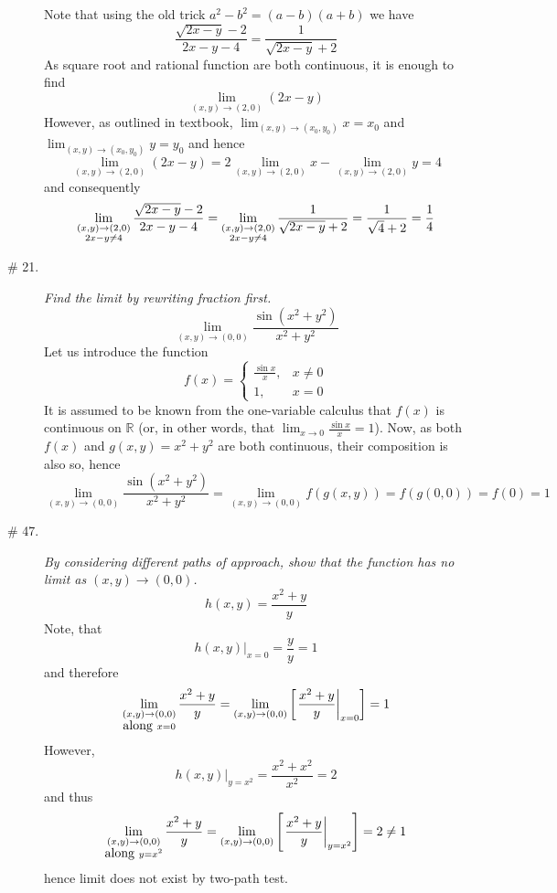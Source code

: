 \documentclass[8pt]{article} %
\begin{document}
\begin{description}
{		Note that using the old trick $a^2-b^2=(a-b)(a+b)$ we have
		\[\frac{\sqrt{2x-y}-2}{2x-y-4}=\frac{1}{\sqrt{2x-y}+2}\]
		As square root and rational function are both continuous, it is enough to find \[\lim_{(x,y)\to(2,0)}(2x-y)\]
		However, as outlined in textbook, $\lim_{(x,y)\to(x_0,y_0)}x=x_0$ and $\lim_{(x,y)\to(x_0,y_0)}y=y_0$ and hence
		\[\lim_{(x,y)\to(2,0)}(2x-y)=2\lim_{(x,y)\to(2,0)}x-\lim_{(x,y)\to(2,0)}y=4\]
		and consequently
		\[\lim_{\begin{subarray}{c}(x,y)\to(2,0)\\2x-y\neq4\end{subarray}}\frac{\sqrt{2x-y}-2}{2x-y-4}
			=\lim_{\begin{subarray}{c}(x,y)\to(2,0)\\2x-y\neq4\end{subarray}}\frac{1}{\sqrt{2x-y}+2}=\frac{
				1}{\sqrt{4}+2}=\frac{1}{4}\]
		}
	\item[\# 21.]{{\it Find the limit by rewriting fraction first.}
		\[\lim_{(x,y)\to(0,0)}\frac{\sin(x^2+y^2)}{x^2+y^2}\]
		Let us introduce the function
		\[f(x)=\left\{\begin{array}{ll}\frac{\sin x}{x},&x\neq 0\\1,&x=0\end{array}\right.\]
		It is assumed to be known from the one-variable calculus that $f(x)$ is continuous on $\mathbb{R}$ (or, in other
		words, that $\lim_{x\to 0}\frac{\sin x}{x}=1$). Now, as both $f(x)$ and $g(x,y)=x^2+y^2$ are both continuous,
		their composition is also so, hence
		\[\lim_{(x,y)\to(0,0)}\frac{\sin(x^2+y^2)}{x^2+y^2}=\lim_{(x,y)\to(0,0)}f(g(x,y))=f(g(0,0))=f(0)=1\]
		}
	\item[\# 47.]{{\it By considering different paths of approach, show that the function has no limit as $(x,y)\to(0,0)$.
		\[h(x,y)=\frac{x^2+y}{y}\]}
		Note, that \[h(x,y)\bigg|_{x=0}=\frac{y}{y}=1\]
		and therefore
		\[\lim_{\begin{subarray}{c}(x,y)\to(0,0)\\\mbox{along }x=0\end{subarray}}\frac{x^2+y}{y}=
			\lim_{(x,y)\to(0,0)}\mysbra{\left.\frac{x^2+y}{y}\right|_{x=0}}=1\]
		However, \[\left.h(x,y)\right|_{y=x^2}=\frac{x^2+x^2}{x^2}=2\]
		and thus
		\[\lim_{\begin{subarray}{c}(x,y)\to(0,0)\\\mbox{along }y=x^2\end{subarray}}\frac{x^2+y}{y}=
			\lim_{(x,y)\to(0,0)}\mysbra{\left.\frac{x^2+y}{y}\right|_{y=x^2}}=2\neq 1\]
		hence limit does not exist by two-path test.
}
\end{description}
\end{document}
